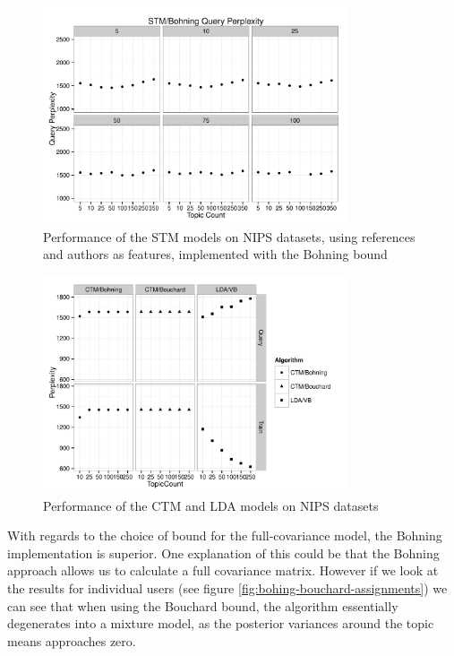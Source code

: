 \begin{figure}
\centering
    \includegraphics[width=0.8\textwidth]{plots/nips-stm-boh-kp.pdf}
    \caption{Performance of the STM models on NIPS datasets, using references and authors as features, implemented with the Bohning bound}
    \label{fig:nips-stm-boh-p-all}
\end{figure}

\begin{figure}
\centering
    \includegraphics[width=0.8\textwidth]{plots/nips-lda-ctm.pdf}
    \caption{Performance of the CTM and LDA models on NIPS datasets}
    \label{fig:nips-lda-ctm}
\end{figure}



With regards to the choice of bound for the full-covariance model, the Bohning implementation is superior. One explanation of this could be that the Bohning approach allows us to calculate a full covariance matrix. However if we look at the results for individual users (see figure \ref{fig:bohing-bouchard-assignments}) we can see that when using the Bouchard bound, the algorithm essentially degenerates into a mixture model, as the posterior variances around the topic means approaches zero. 



